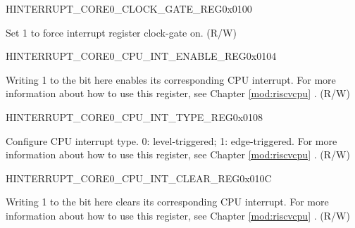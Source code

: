 \begin{register}{H}{INTERRUPT\_CORE0\_CLOCK\_GATE\_REG}{0x0100}\label{regdesc:INTERRUPTCORE0CLOCKGATEREG}
%
%
\regnewline%
\begin{regdesc}\begin{reglist}
\label{fielddesc:INTERRUPTCORE0CLKEN}\item [INTERRUPT\_CORE0\_CLK\_EN] Set 1 to force interrupt register clock-gate on. (R/W)
\end{reglist}\end{regdesc}
\end{register}


\begin{register}{H}{INTERRUPT\_CORE0\_CPU\_INT\_ENABLE\_REG}{0x0104}\label{regdesc:INTERRUPTCORE0CPUINTENABLEREG}
%
\regnewline%
\begin{regdesc}\begin{reglist}
\label{fielddesc:INTERRUPTCORE0CPUINTENABLE}\item [INTERRUPT\_CORE0\_CPU\_INT\_ENABLE] Writing 1 to the bit here enables its corresponding CPU interrupt. For more information about how to use this register, see Chapter \ref{mod:riscvcpu} \textit{}. (R/W)
\end{reglist}\end{regdesc}
\end{register}


\begin{register}{H}{INTERRUPT\_CORE0\_CPU\_INT\_TYPE\_REG}{0x0108}\label{regdesc:INTERRUPTCORE0CPUINTTYPEREG}
%
\regnewline%
\begin{regdesc}\begin{reglist}
\label{fielddesc:INTERRUPTCORE0CPUINTTYPE}\item [INTERRUPT\_CORE0\_CPU\_INT\_TYPE] Configure CPU interrupt type. 0: level-triggered; 1: edge-triggered. For more information about how to use this register, see Chapter \ref{mod:riscvcpu} \textit{}. (R/W)
\end{reglist}\end{regdesc}
\end{register}


\begin{register}{H}{INTERRUPT\_CORE0\_CPU\_INT\_CLEAR\_REG}{0x010C}\label{regdesc:INTERRUPTCORE0CPUINTCLEARREG}
%
\regnewline%
\begin{regdesc}\begin{reglist}
\label{fielddesc:INTERRUPTCORE0CPUINTCLEAR}\item [INTERRUPT\_CORE0\_CPU\_INT\_CLEAR] Writing 1 to the bit here clears its corresponding CPU interrupt. For more information about how to use this register, see Chapter \ref{mod:riscvcpu} \textit{}. (R/W)
\end{reglist}\end{regdesc}
\end{register}


